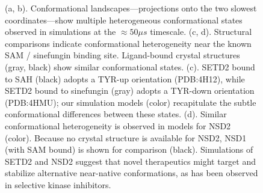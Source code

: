 \documentclass[12pt]{article}
\begin{document}
\begin{figure}
\caption{
(a, b).  Conformational landscapes---projections onto the two slowest coordinates---show multiple heterogeneous conformational states observed in simulations at the $\approx 50 \mu s$ timescale.  (c, d). Structural comparisons indicate conformational heterogeneity near the known SAM / sinefungin binding site.  Ligand-bound crystal structures (gray, black) show similar conformational states.  (c).  SETD2 bound to SAH (black) adopts a TYR-up orientation (PDB:4H12), while SETD2 bound to sinefungin (gray) adopts a TYR-down orientation (PDB:4HMU); our simulation models (color) recapitulate the subtle conformational differences between these states.  (d).  Similar conformational heterogeneity is observed in models for NSD2 (color).  Because no crystal structure is available for NSD2, NSD1 (with SAM bound) is shown for comparison (black).  Simulations of SETD2 and NSD2 suggest that novel therapeutics might target and stabilize alternative near-native conformations, as has been observed in selective kinase inhibitors.
}
\label{figure:MSM}
\end{figure}




\end{document}
